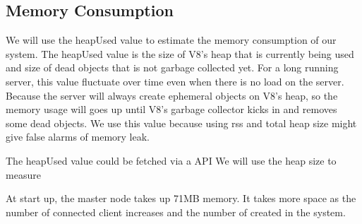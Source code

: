 \subsection{Memory Consumption}
We will use the heapUsed value to estimate the memory consumption of our system.
The heapUsed value is the size of V8's heap that is currently being used and
size of dead objects that is not garbage collected yet.
For a long running \nodejs{} server,
this value fluctuate over time even when there is no load on the server.
Because the server will always create ephemeral objects on V8's heap,
so the memory usage will goes up until V8's garbage collector kicks in
and removes some dead objects.
We use this value because using rss and total heap size might give false alarms
of memory leak.

The heapUsed value could be fetched via a \nodejs{} API 
We will use the heap size to measure 


At start up, the master node takes up 71MB memory.
It takes more space as the number of connected client increases and the number
of \appins{} created in the system.
